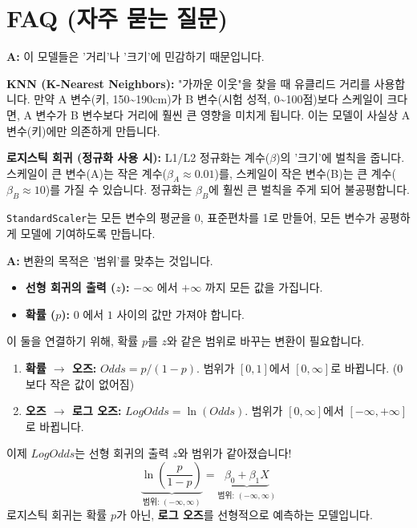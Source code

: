 \documentclass[11pt,a4paper]{book}
\theoremstyle{definition}
\begin{document}
\section{FAQ (자주 묻는 질문)}

\begin{tcolorbox}[breakable, title={Q: 왜 KNN이나 로지스틱 회귀 전에 \texttt{StandardScaler}를 써야 하나요?}]
\textbf{A:} 이 모델들은 '거리'나 '크기'에 민감하기 때문입니다.

\textbf{KNN (K-Nearest Neighbors):} "가까운 이웃"을 찾을 때 유클리드 거리를 사용합니다. 만약 A 변수(키, 150\textasciitilde190cm)가 B 변수(시험 성적, 0\textasciitilde100점)보다 스케일이 크다면, A 변수가 B 변수보다 거리에 훨씬 큰 영향을 미치게 됩니다. 이는 모델이 사실상 A 변수(키)에만 의존하게 만듭니다.

\textbf{로지스틱 회귀 (정규화 사용 시):} L1/L2 정규화는 계수($\beta$)의 '크기'에 벌칙을 줍니다. 스케일이 큰 변수(A)는 작은 계수($\beta_A \approx 0.01$)를, 스케일이 작은 변수(B)는 큰 계수($\beta_B \approx 10$)를 가질 수 있습니다. 정규화는 $\beta_B$에 훨씬 큰 벌칙을 주게 되어 불공평합니다.

\texttt{StandardScaler}는 모든 변수의 평균을 0, 표준편차를 1로 만들어, 모든 변수가 공평하게 모델에 기여하도록 만듭니다.
\end{tcolorbox}

\begin{tcolorbox}[breakable, title={Q: 로그 오즈, 오즈, 확률... 너무 헷갈립니다.}]
\textbf{A:} 변환의 목적은 '범위'를 맞추는 것입니다.
\begin{itemize}
    \item \textbf{선형 회귀의 출력 ($z$):} $-\infty$ 에서 $+\infty$ 까지 모든 값을 가집니다.
    \item \textbf{확률 ($p$):} $0$ 에서 $1$ 사이의 값만 가져야 합니다.
\end{itemize}
이 둘을 연결하기 위해, 확률 $p$를 $z$와 같은 범위로 바꾸는 변환이 필요합니다.

\begin{enumerate}
    \item \textbf{확률 $\rightarrow$ 오즈:} $Odds = p / (1-p)$. 범위가 $[0, 1]$에서 $[0, \infty]$로 바뀝니다. (0보다 작은 값이 없어짐)
    \item \textbf{오즈 $\rightarrow$ 로그 오즈:} $LogOdds = \ln(Odds)$. 범위가 $[0, \infty]$에서 $[-\infty, +\infty]$로 바뀝니다.
\end{enumerate}
이제 $LogOdds$는 선형 회귀의 출력 $z$와 범위가 같아졌습니다!
$$ \underbrace{\ln(\frac{p}{1-p})}_{\text{범위: } (-\infty, \infty)} = \underbrace{\beta_0 + \beta_1 X}_{\text{범위: } (-\infty, \infty)} $$
로지스틱 회귀는 확률 $p$가 아닌, \textbf{로그 오즈}를 선형적으로 예측하는 모델입니다.
\end{tcolorbox}
\end{document}
